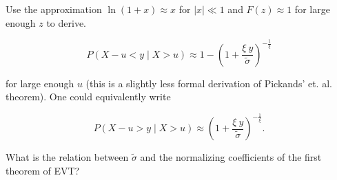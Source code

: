 Use the approximation $\ln(1+x) \approx x$ for $|x| \ll 1$ and $F(z) \approx
1$ for large enough $z$ to derive.


\begin{equation}
    \label{GPD-approx-original}
    P(X-u < y \mid X > u) \approx 1 - \left( 1 + \frac{\xi \ y}{\tilde{\sigma}} \right)^{-\frac{1}{\xi}} 
\end{equation}


for large enough $u$ (this is a slightly less formal derivation of Pickands' et.
al. theorem). One could equivalently write


\begin{equation}
    P(X-u > y \mid X > u) \approx \left( 1 + \frac{\xi \ y}{\tilde{\sigma}} \right)^{-\frac{1}{\xi}}.
\end{equation}


What is the relation between $\tilde{\sigma}$ and the normalizing coefficients
of the first theorem of EVT?
